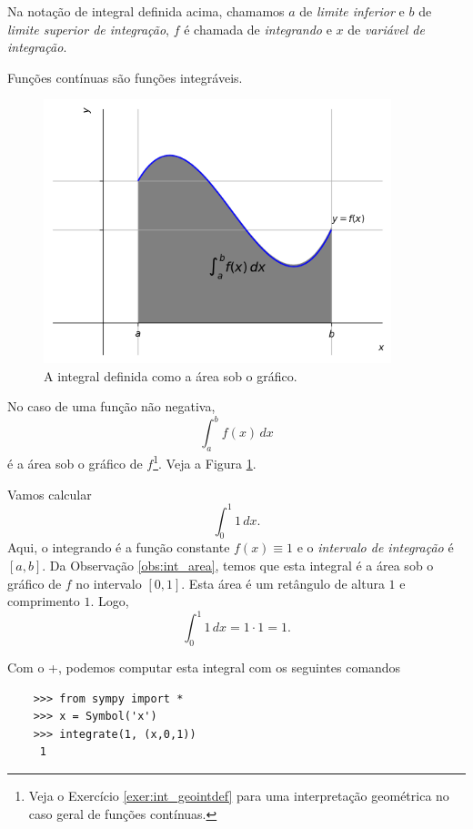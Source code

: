 \begin{obs}
  Na notação de integral definida acima, chamamos $a$ de \emph{limite inferior} e $b$ de \emph{limite superior de integração}, $f$ é chamada de \emph{integrando} e $x$ de \emph{variável de integração}.
\end{obs}

\begin{obs}
  Funções contínuas são funções integráveis.
\end{obs}

\begin{figure}[H]
  \centering
  \includegraphics[width=0.9\textwidth]{./cap_int/dados/fig_geointdef/fig_geointdef}
  \caption{A integral definida como a área sob o gráfico.}
  \label{fig:geointdef}
\end{figure}

\begin{obs}\label{obs:int_area}
  No caso de uma função não negativa,
  \begin{equation}
    \int_a^b f(x)\,dx
  \end{equation}
  é a área sob o gráfico de $f$\footnote{Veja o Exercício \ref{exer:int_geointdef} para uma interpretação geométrica no caso geral de funções contínuas.}. Veja a Figura \ref{fig:geointdef}.  
\end{obs}

\begin{ex}
  Vamos calcular
  \begin{equation}
    \int_0^1 1\,dx.
  \end{equation}
  Aqui, o integrando é a função constante $f(x) \equiv 1$ e o \emph{intervalo de integração} é $[a, b]$. Da Observação \ref{obs:int_area}, temos que esta integral é a área sob o gráfico de $f$ no intervalo $[0, 1]$. Esta área é um retângulo de altura $1$ e comprimento $1$. Logo,
  \begin{equation}
    \int_0^1 1\,dx = 1\cdot 1 = 1.
  \end{equation}

  \ifispython
  Com o {\python}+{\sympy}, podemos computar esta integral com os seguintes comandos
  \begin{lstlisting}
    >>> from sympy import *
    >>> x = Symbol('x')
    >>> integrate(1, (x,0,1))
     1
  \end{lstlisting}
  \fi
\end{ex}

